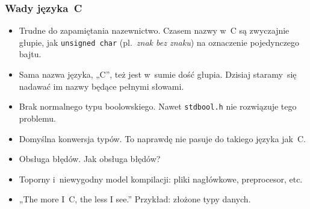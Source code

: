 \documentclass[10pt,t]{beamer}
\begin{document}
\begin{frame}
  \frametitle{Wady języka~C}


  \begin{itemize}

  \item Trudne do zapamiętania nazewnictwo. Czasem nazwy w~C są zwyczajnie
    głupie, jak \texttt{unsigned char} (pl.~\textit{znak bez znaku}) na
    oznaczenie pojedynczego bajtu.

  \item  Sama nazwa języka, „C”, też jest w~sumie dość głupia. Dzisiaj
    staramy~się nadawać im nazwy będące pełnymi słowami.

  \item Brak normalnego typu boolowskiego. Nawet \texttt{stdbool.h} nie
    rozwiązuje tego problemu.

  \item Domyślna konwersja typów. To naprawdę nie pasuje do takiego
    języka jak~C.

  \item Obsługa błędów. Jak obsługa błędów?

  \item Toporny i~niewygodny model kompilacji: pliki nagłówkowe,
    preprocesor, etc.

  \item „The more I~C, the less I see.” Przykład: złożone typy danych.



  \end{itemize}

\end{frame}
\end{document}
